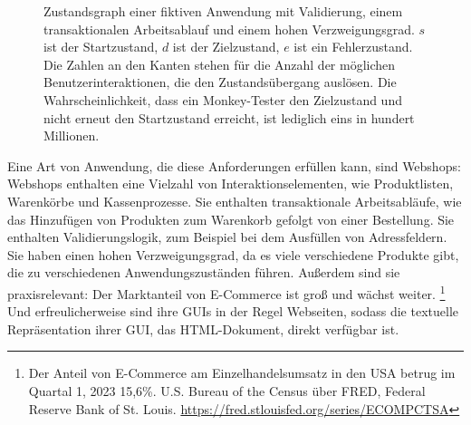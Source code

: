 \begin{figure}
    \centering
    \caption{Zustandsgraph einer fiktiven Anwendung mit Validierung, einem transaktionalen Arbeitsablauf und einem hohen Verzweigungsgrad. $s$ ist der Startzustand, $d$ ist der Zielzustand, $e$ ist ein Fehlerzustand. Die Zahlen an den Kanten stehen für die Anzahl der möglichen Benutzerinteraktionen, die den Zustandsübergang auslösen. Die Wahrscheinlichkeit, dass ein Monkey-Tester den Zielzustand und nicht erneut den Startzustand erreicht, ist lediglich eins in hundert Millionen.}
    \label{fig:sad_monkey}
\end{figure}

Eine Art von Anwendung, die diese Anforderungen erfüllen kann, sind Webshops:
Webshops enthalten eine Vielzahl von Interaktionselementen, wie Produktlisten, Warenkörbe und Kassenprozesse.
Sie enthalten transaktionale Arbeitsabläufe, wie das Hinzufügen von Produkten zum Warenkorb gefolgt von einer Bestellung.
Sie enthalten Validierungslogik, zum Beispiel bei dem Ausfüllen von Adressfeldern.
Sie haben einen hohen Verzweigungsgrad, da es viele verschiedene Produkte gibt, die zu verschiedenen Anwendungszuständen führen.
Außerdem sind sie praxisrelevant: Der Marktanteil von E-Commerce ist groß und wächst weiter.
\footnote{
Der Anteil von E-Commerce am Einzelhandelsumsatz in den USA betrug im Quartal 1, 2023 15,6\%. U.S. Bureau of the Census über FRED, Federal Reserve Bank of St. Louis. \url{https://fred.stlouisfed.org/series/ECOMPCTSA}}
Und erfreulicherweise sind ihre GUIs in der Regel Webseiten, sodass die textuelle Repräsentation ihrer GUI, das HTML-Dokument, direkt verfügbar ist.

